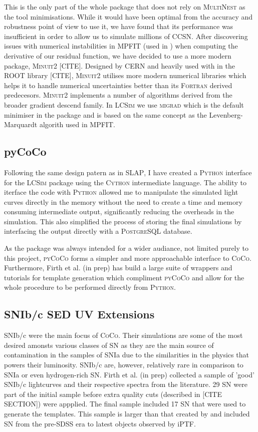 This is the only part of the whole package that does not rely on \textsc{MultiNest} as the tool minimisations. While it would have been optimal from the accuracy and robustness point of view to use it, we have found that its performance was insufficient in order to allow us to simulate millions of CCSN. After discovering issues with numerical instabilities in \textsc{MPFIT} (used in ) when computing the derivative of our residual function, we have decided to use a more modern package, \textsc{Minuit2} [CITE]. Designed by CERN and heavily used with in the ROOT library [CITE], \textsc{Minuit2} utilises more modern numerical libraries which helps it to handle numerical uncertainties better than its \textsc{Fortran} derived predecesors. \textsc{Minuit2} implements a number of algorithms derived from the broader gradient descend family. In \textsc{LCSim} we use \textsc{migrad} which is the default minimiser in the package and is based on the same concept as the Levenberg-Marquardt algorith used in \textsc{MPFIT}.

\subsection{pyCoCo}
Following the same design patern as in \textsc{SLAP}, I have created a \textsc{Python} interface for the \textsc{LCSim} package using the \textsc{Cython} intermediate language. The ability to iterface the code with \textsc{Python} allowed me to manipulate the simulated light curves directly in the memory without the need to create a time and memory consuming intermediate output, significantly reducing the overheads in the simulation. This also simplified the process of storing the final simulations by interfacing the output directly with a \textsc{PostgreSQL} database.

As the package was always intended for a wider audiance, not limited purely to this project, \textsc{pyCoCo} forms a simpler and more approachable interface to \textsc{CoCo}. Furthermore, Firth et al. (in prep) has build a large suite of wrappers and tutorials for template generation which compliment \textsc{pyCoCo} and allow for the whole procedure to be performed directly from \textsc{Python}.

\subsection{SNIb/c SED UV Extensions}
SNIb/c were the main focus of \textsc{CoCo}. Their simulations are some of the most desired amonsts various classes of SN as they are the main source of contamination in the samples of SNIa due to the similarities in the physics that powers their luminosity. SNIb/c are, however, relatively rare in comparison to SNIa or even hydrogen-rich SN.   Firth et al. (in prep) collected a sample of 'good' SNIb/c lightcurves and their respective spectra from the literature. 29 SN were part of the initial sample before extra quality cuts (described in [CITE SECTION]) were appplied. The final sample included 17 SN that were used to generate the templates. This sample is larger than that created by \citet{Kessler2010} and included SN from the pre-SDSS era to latest objects observed by iPTF.

